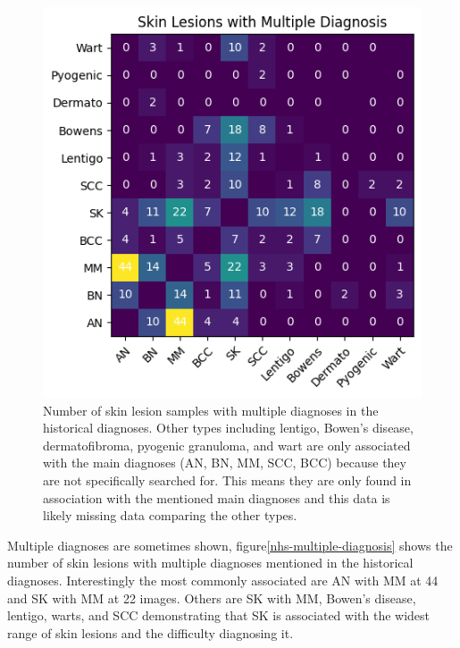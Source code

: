\begin{figure}
	\centering
	\includegraphics[scale=0.75]{images/nhs/nhs-multiple-diagnosis.png}
	\caption{Number of skin lesion samples with multiple diagnoses in the historical diagnoses. Other types including lentigo, Bowen's disease, dermatofibroma, pyogenic granuloma, and wart are only associated with the main diagnoses (AN, BN, MM, SCC, BCC) because they are not specifically searched for. This means they are only found in association with the mentioned main diagnoses and this data is likely missing data comparing the other types.}
\end{figure}\label{nhs-multiple-diagnosis}

Multiple diagnoses are sometimes shown, figure\ref{nhs-multiple-diagnosis} shows the number of skin lesions with multiple diagnoses mentioned in the historical diagnoses. Interestingly the most commonly associated are AN with MM at 44 and SK with MM at 22 images. Others are SK with MM, Bowen's disease, lentigo, warts, and SCC demonstrating that SK is associated with the widest range of skin lesions and the difficulty diagnosing it.

